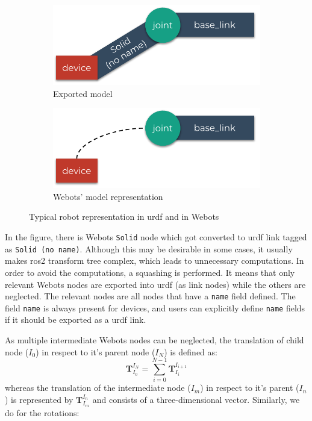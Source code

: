 \begin{figure}[H]
\centering
\begin{subfigure}{\textwidth}
  \centering
  \includegraphics[width=.7\linewidth]{generalization/figures/squashing_transforms_actual.pdf}
  \caption{Exported model}
  \label{fig:generalization:squashing_transforms:actual}
\end{subfigure}
\begin{subfigure}{\textwidth}
  \centering
  \includegraphics[width=.7\linewidth]{generalization/figures/squashing_transforms_desired.pdf}
  \caption{Webots' model representation}
  \label{fig:generalization:squashing_transforms:desired}
\end{subfigure}
\caption{Typical robot representation in \ac{urdf} and in Webots}
\label{fig:generalization:squashing_transforms}
\end{figure}

In the figure, there is Webots \texttt{Solid} node which got converted to \ac{urdf} link tagged as \texttt{Solid (no name)}. 
Although this may be desirable in some cases, it usually makes \ac{ros2} transform tree complex, which leads to unnecessary computations.
In order to avoid the computations, a squashing is performed.
It means that only relevant Webots nodes are exported into \ac{urdf} (as link nodes) while the others are neglected.
The relevant nodes are all nodes that have a \texttt{name} field defined.
The field \texttt{name} is always present for devices, and users can explicitly define \texttt{name} fields if it should be exported as a \ac{urdf} link.

As multiple intermediate Webots nodes can be neglected, the translation of child node ($I_0$) in respect to it's parent node ($I_N$) is defined as:
\begin{equation}
    \bm{T}_{I_0}^{I_N} = \sum_{i=0}^{N-1} \bm{T}_{I_i}^{I_{i+1}}
\end{equation}
whereas the translation of the intermediate node ($I_m$) in respect to it's parent ($I_n$) is represented by $ \bm{T}_{I_m}^{I_n} $ and consists of a three-dimensional vector.
Similarly, we do for the rotations:

